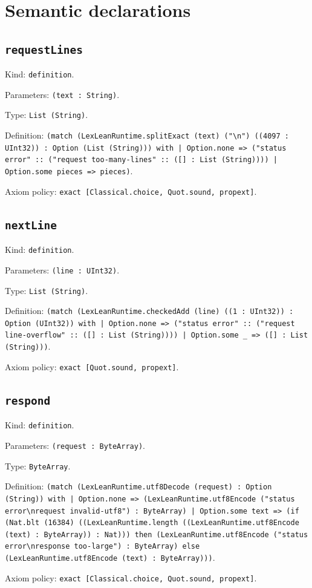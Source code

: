 \documentclass[11pt]{article}
\begin{document}
\section*{Semantic declarations}
\subsection*{\texttt{requestLines}}
\noindent Kind: \texttt{definition}.\par
\noindent Parameters: \texttt{(text : String)}.\par
\noindent Type: \texttt{List (String)}.\par
\noindent Definition: \texttt{(match (LexLeanRuntime.splitExact (text) ("\textbackslash{}n") ((4097 : UInt32)) : Option (List (String))) with | Option.none => ("status error" :: ("request too-many-lines" :: ([] : List (String)))) | Option.some pieces => pieces)}.\par
\noindent Axiom policy: \texttt{exact [Classical.choice, Quot.sound, propext]}.\par
\subsection*{\texttt{nextLine}}
\noindent Kind: \texttt{definition}.\par
\noindent Parameters: \texttt{(line : UInt32)}.\par
\noindent Type: \texttt{List (String)}.\par
\noindent Definition: \texttt{(match (LexLeanRuntime.checkedAdd (line) ((1 : UInt32)) : Option (UInt32)) with | Option.none => ("status error" :: ("request line-overflow" :: ([] : List (String)))) | Option.some \_ => ([] : List (String)))}.\par
\noindent Axiom policy: \texttt{exact [Quot.sound, propext]}.\par
\subsection*{\texttt{respond}}
\noindent Kind: \texttt{definition}.\par
\noindent Parameters: \texttt{(request : ByteArray)}.\par
\noindent Type: \texttt{ByteArray}.\par
\noindent Definition: \texttt{(match (LexLeanRuntime.utf8Decode (request) : Option (String)) with | Option.none => (LexLeanRuntime.utf8Encode ("status error\textbackslash{}nrequest invalid-utf8") : ByteArray) | Option.some text => (if (Nat.blt (16384) ((LexLeanRuntime.length ((LexLeanRuntime.utf8Encode (text) : ByteArray)) : Nat))) then (LexLeanRuntime.utf8Encode ("status error\textbackslash{}nresponse too-large") : ByteArray) else (LexLeanRuntime.utf8Encode (text) : ByteArray)))}.\par
\noindent Axiom policy: \texttt{exact [Classical.choice, Quot.sound, propext]}.\par
\end{document}

